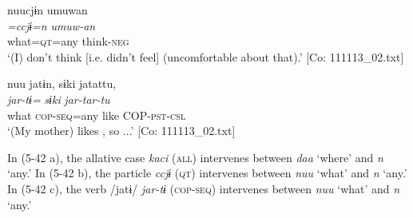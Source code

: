 \glll  nuucjɨn  umuwan\\
\textit{=ccjɨ=n}  \textit{umuw-an}\\
what=\textsc{qt}=any  think-\textsc{neg}\\
\glt ‘(I) don’t think [i.e. didn’t feel]  (uncomfortable about that).’ [Co: 111113\_02.txt]

 \ex \label{ex:5:c} %
\glll  nuu  jatɨn,  sɨki  jatattu,\\
\textit{}  \textit{jar-tɨ=}  \textit{sɨki}  \textit{jar-tar-tu}\\
what  \textsc{cop}-\textsc{seq}=any  like  COP-\textsc{pst}-\textsc{csl}\\
\glt ‘(My mother) likes , so ...’ [Co: 111113\_02.txt]
\z
\z

In (5-42 a), the allative case \textit{kaci} (\textsc{all}) intervenes between \textit{daa} ‘where’ and \textit{n} ‘any.’ In (5-42 b), the particle \textit{ccjɨ} (\textsc{qt}) intervenes between \textit{nuu} ‘what’ and \textit{n} ‘any.’ In (5-42 c), the verb /jatɨ/ \textit{jar-tɨ} (\textsc{cop}-\textsc{seq}) intervenes between \textit{nuu} ‘what’ and \textit{n} ‘any.’

